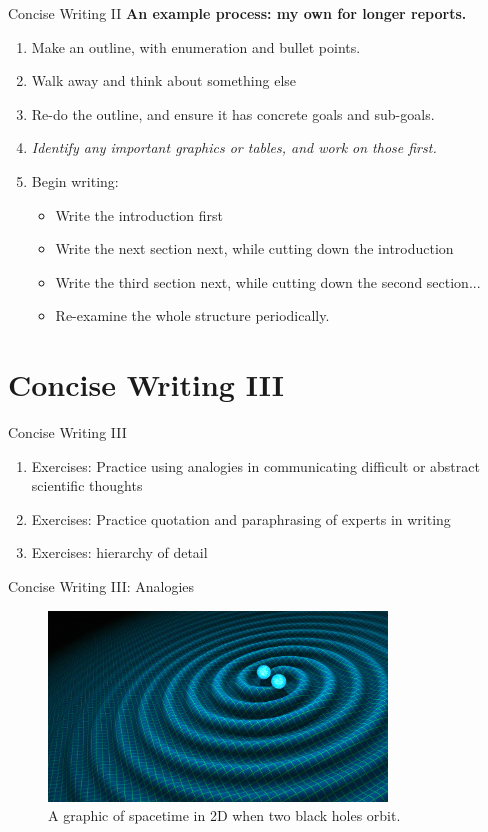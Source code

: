 \documentclass{beamer}
\begin{document}
\begin{frame}{Concise Writing II}
\textbf{An example process: my own for longer reports.}
\begin{enumerate}
\item Make an outline, with enumeration and bullet points.
\item Walk away and think about something else
\item Re-do the outline, and ensure it has concrete goals and sub-goals.
\item \textit{Identify any important graphics or tables, and work on those first.}
\item Begin writing:
\begin{itemize}
\item Write the introduction first
\item Write the next section next, while cutting down the introduction
\item Write the third section next, while cutting down the second section...
\item Re-examine the whole structure periodically.
\end{itemize}
\end{enumerate}
\end{frame}

\section{Concise Writing III}

\begin{frame}{Concise Writing III}
\begin{enumerate}
\item Exercises: Practice using analogies in communicating difficult or abstract scientific thoughts
\item Exercises: Practice quotation and paraphrasing of experts in writing
\item Exercises: hierarchy of detail
\end{enumerate}
\end{frame}

\begin{frame}{Concise Writing III: Analogies}
\begin{figure}
\includegraphics[width=9cm]{figures/waves.jpg}
\caption{\label{fig:waves} A graphic of spacetime in 2D when two black holes orbit.}
\end{figure}
\end{frame}
\end{document}
